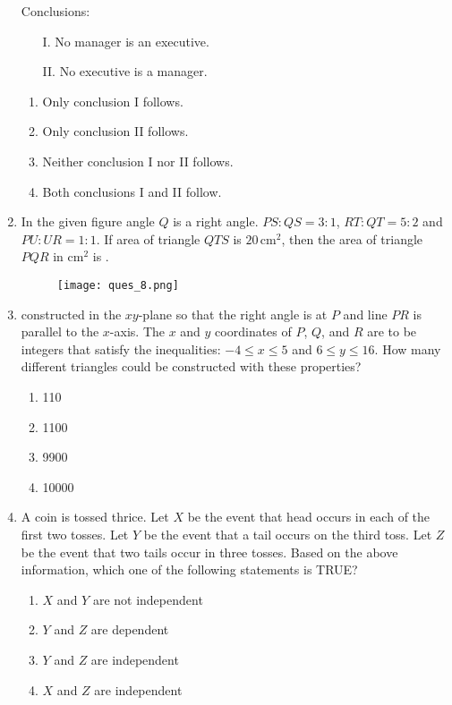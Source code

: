 \documentclass[journal]{IEEEtran}
\numberwithin{equation}{enumi}
\numberwithin{figure}{enumi}
\begin{document}
\begin{enumerate}
Conclusions:
\begin{enumerate}
    \item[I.] No manager is an executive.
    \item[II.] No executive is a manager.
\end{enumerate}
\begin{enumerate}
    \item Only conclusion I follows.
    \item Only conclusion II follows.
    \item Neither conclusion I nor II follows.
    \item Both conclusions I and II follow.
\end{enumerate}

\item In the given figure angle $Q$ is a right angle. $PS:QS=3:1$, $RT:QT=5:2$ and $PU:UR=1:1$. If area of triangle $QTS$ is $20\,\mathrm{cm}^2$, then the area of triangle $PQR$ in $\mathrm{cm}^2$ is \underline{\hspace{2cm}}. 
\hfill{}
\vspace{1em}

\begin{figure}[ht!]
    \centering
    \texttt{[image: ques\_8.png]}
    \caption{}
    \label{fig:fig1.jpeg}
\end{figure}

\item constructed in the $xy$-plane so that the right angle is at $P$ and line $PR$ is parallel to the $x$-axis. The $x$ and $y$ coordinates of $P$, $Q$, and $R$ are to be integers that satisfy the inequalities: $-4 \leq x \leq 5$ and $6 \leq y \leq 16$. How many different triangles could be constructed with these properties?
\hfill{}
\begin{multicols}{4}
\begin{enumerate}
    \item 110
    \item 1100
    \item 9900
    \item 10000
\end{enumerate}
\end{multicols}


\item A coin is tossed thrice. Let $X$ be the event that head occurs in each of the first two tosses. Let $Y$ be the event that a tail occurs on the third toss. Let $Z$ be the event that two tails occur in three tosses. Based on the above information, which one of the following statements is TRUE?
\hfill{}
\begin{multicols}{2}
\begin{enumerate}
    \item $X$ and $Y$ are not independent
    \item $Y$ and $Z$ are dependent
    \item $Y$ and $Z$ are independent
    \item $X$ and $Z$ are independent
\end{enumerate}
\end{multicols}


\end{enumerate}
\end{document}
